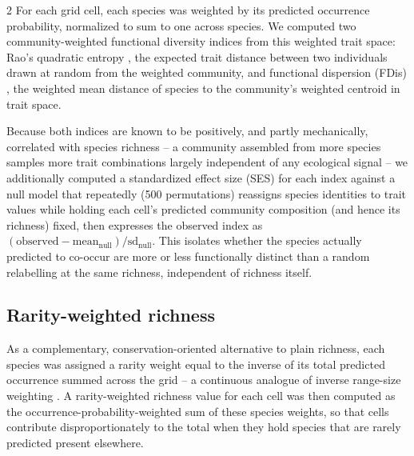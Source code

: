 \begin{spacing}{2}
For each grid cell, each species was weighted by its predicted occurrence probability, normalized to sum to one across species. We computed two community-weighted functional diversity indices from this weighted trait space: Rao's quadratic entropy \citep{raoDiversityDissimilarity1982, bottadukatRaosQuadraticEntropy2005}, the expected trait distance between two individuals drawn at random from the weighted community, and functional dispersion (FDis) \citep{laliberteDistanceBasedFramework2010}, the weighted mean distance of species to the community's weighted centroid in trait space.

Because both indices are known to be positively, and partly mechanically, correlated with species richness -- a community assembled from more species samples more trait combinations largely independent of any ecological signal -- we additionally computed a standardized effect size (SES) for each index against a null model that repeatedly (500 permutations) reassigns species identities to trait values while holding each cell's predicted community composition (and hence its richness) fixed, then expresses the observed index as $(\text{observed} - \text{mean}_{\text{null}}) / \text{sd}_{\text{null}}$. This isolates whether the species actually predicted to co-occur are more or less functionally distinct than a random relabelling at the same richness, independent of richness itself.

\subsection{Rarity-weighted richness}
As a complementary, conservation-oriented alternative to plain richness, each species was assigned a rarity weight equal to the inverse of its total predicted occurrence summed across the grid -- a continuous analogue of inverse range-size weighting \citep{williamsMeasuringBiodiversityComplementary1996}. A rarity-weighted richness value for each cell was then computed as the occurrence-probability-weighted sum of these species weights, so that cells contribute disproportionately to the total when they hold species that are rarely predicted present elsewhere.


\end{spacing}
